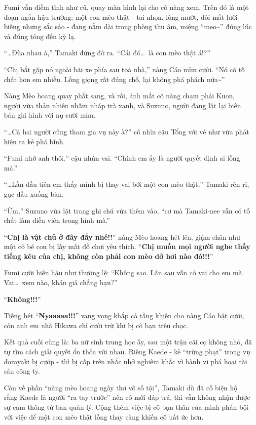 \documentclass[../main.tex]{subfiles}
\begin{document}
Fumi vẫn điềm tĩnh như cũ, quay màn hình lại cho cô nàng xem. Trên đó là một đoạn ngắn hậu trường: một con mèo thật - tai nhọn, lông mướt, đôi mắt lười biếng nhưng sắc sảo - đang nằm dài trong phòng thu âm, miệng ``meo\~{}'' đúng lúc và đúng tông đến kỳ lạ.

``\dots Đùa nhau à,'' Tamaki đứng đờ ra. ``Cái đó\dots\ là con mèo thật á!?''

``Chị bắt gặp nó ngoài bãi xe phía sau toà nhà,'' nàng Cáo mỉm cười. ``Nó có tố chất hơn em nhiều. Lồng giọng rất đúng chỗ, lại không phá phách nữa\~{}''

Nàng Mèo hoang quay phắt sang, và rồi, ánh mắt cô nàng chạm phải Kuon, người vừa thản nhiên nhấm nháp trà xanh, và Suzuno, người đang lật lại biên bản ghi hình với nụ cười mỉm.

``\dots Cả hai người cũng tham gia vụ này à?'' cô nhìn cậu Tổng với vẻ như vừa phát hiện ra kẻ phá bĩnh.

``Fumi nhờ anh thôi,'' cậu nhún vai. ``Chính em ấy là người quyết định ai lồng mà.''

``\dots Lần đầu tiên em thấy mình bị thay vai bởi một con mèo thật,'' Tamaki rên rỉ, gục đầu xuống bàn.

``Ừm,'' Suzuno vừa lật trang ghi chú vừa thêm vào, ``cơ mà Tamaki-nee vẫn có tố chất làm diễn viên trong hình mà.''

``\textbf{Chị là vật chủ ở đây đấy nhé!!}'' nàng Mèo hoang hét lên, giậm chân như một cô bé con bị lấy mất đồ chơi yêu thích. ``\textbf{Chị muốn mọi người nghe thấy tiếng kêu của chị, không còn phải con mèo dở hơi nào đó!!!}''

Fumi cười hiền hậu như thường lệ: ``Không sao. Lần sau vẫn có vai cho em mà. Vai\dots\ xem nào, khán giả chẳng hạn?''

``\textbf{Không!!!}''

Tiếng hét ``\textbf{Nyaaaaa!!!}'' vang vọng khắp cả tầng khiến cho nàng Cáo bật cười, còn anh em nhà Hikawa chỉ cười trừ khi bị cô bạn trêu chọc.

Kết quả cuối cùng là: ba nữ sinh trung học ấy, sau một trận cãi cọ không nhỏ, đã tự tìm cách giải quyết ổn thỏa với nhau. Riêng Kaede - kẻ ``trừng phạt'' trong vụ dorayaki bị cướp - thì bị cấp trên nhắc nhở nghiêm khắc vì hành vi phá hoại tài sản công ty.

Còn về phần ``nàng mèo hoang ngây thơ vô số tội'', Tamaki dù đã cố biện hộ rằng Kaede là người ``ra tay trước'' nên cô mới đáp trả, thì vẫn không nhận được sự cảm thông từ ban quản lý. Cộng thêm việc bị cô bạn thân của mình phản bội với việc để một con mèo thật lồng thay càng khiến cô uất ức hơn.
\end{document}
